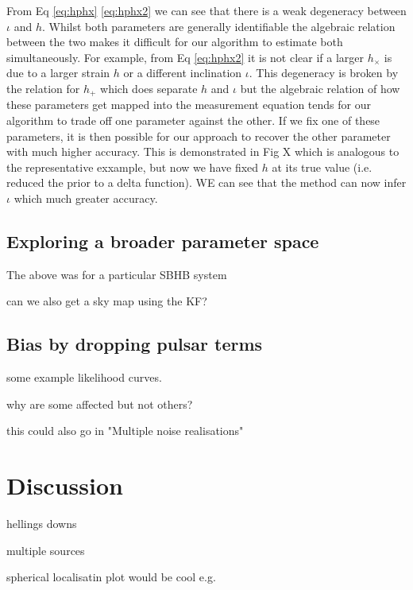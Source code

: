 \documentclass[fleqn,usenatbib,useAMS]{mnras}
\begin{document}
From Eq \ref{eq:hphx} \ref{eq:hphx2} we can see that there is a weak degeneracy between $\iota$ and $h$. Whilst both parameters are generally identifiable the algebraic relation between the two makes it difficult for our algorithm to estimate both simultaneously. For example, from Eq \ref{eq:hphx2} it is not clear if a larger $h_{\times}$ is due to a larger strain $h$ or a different inclination $\iota$. This degeneracy is broken by the relation for $h_{+}$ which does separate $h$ and $\iota$ but the algebraic relation of how these parameters get mapped into the measurement equation tends for our algorithm to trade off one parameter against the other. If we fix one of these parameters, it is then possible for our approach to recover the other parameter with much higher accuracy. This is demonstrated in Fig X which is analogous to the representative exxample, but now we have fixed $h$ at its true value (i.e. reduced the prior to a delta function). WE can see that the method can now infer $\iota$ which much greater accuracy. 







\subsection{Exploring a broader parameter space} \label{sec:parameter_space}



The above was for a particular SBHB system




can we also get a sky map using the KF? 
\subsection{Bias by dropping pulsar terms}

some example likelihood curves. 



why are some affected but not others?


this could also go in "Multiple noise realisations"


\section{Discussion}


hellings downs 


multiple sources


spherical localisatin plot would be cool e.g. 
\end{document}
